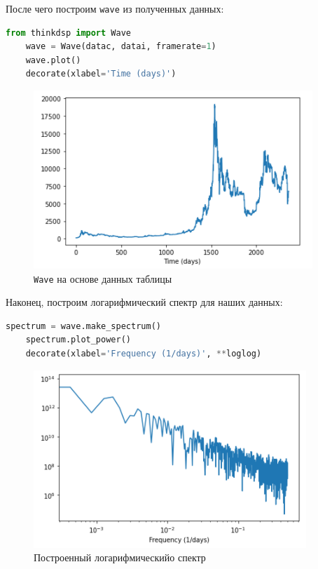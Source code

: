 \documentclass[a4paper]{article}
\begin{document}
            После чего построим \texttt{wave} из полученных данных:
            
\begin{lstlisting}[language=Python, caption= Построение \texttt{wave}]
    from thinkdsp import Wave
    wave = Wave(datac, datai, framerate=1)
    wave.plot()
    decorate(xlabel='Time (days)')
\end{lstlisting}               
            
            \begin{figure}[H]
                \centering
                \includegraphics{ex_3_bitcoin_wave.png}
                \caption{\texttt{Wave} на основе данных таблицы}
                \label{fig:ex_3_bitcoin_wave}
            \end{figure}
            
            Наконец, построим логарифмический спектр для наших данных:
            
\begin{lstlisting}[language=Python, caption= Построение логарифмического спектра]
    spectrum = wave.make_spectrum()
    spectrum.plot_power()
    decorate(xlabel='Frequency (1/days)', **loglog)
\end{lstlisting}               
            
            \begin{figure}[H]
                \centering
                \includegraphics{ex_3_bitcoin_log_spectr.png}
                \caption{Построенный логарифмическийо спектр}
                \label{fig:ex_3_bitcoin_log_spectr}
            \end{figure}
            
\end{document}
